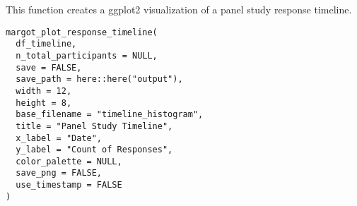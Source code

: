 \documentclass[a4paper]{book}
\begin{document}
%
\begin{Description}
This function creates a ggplot2 visualization of a panel study response timeline.
\end{Description}
%
\begin{Usage}
\begin{verbatim}
margot_plot_response_timeline(
  df_timeline,
  n_total_participants = NULL,
  save = FALSE,
  save_path = here::here("output"),
  width = 12,
  height = 8,
  base_filename = "timeline_histogram",
  title = "Panel Study Timeline",
  x_label = "Date",
  y_label = "Count of Responses",
  color_palette = NULL,
  save_png = FALSE,
  use_timestamp = FALSE
)
\end{verbatim}
\end{Usage}
%
\end{document}
